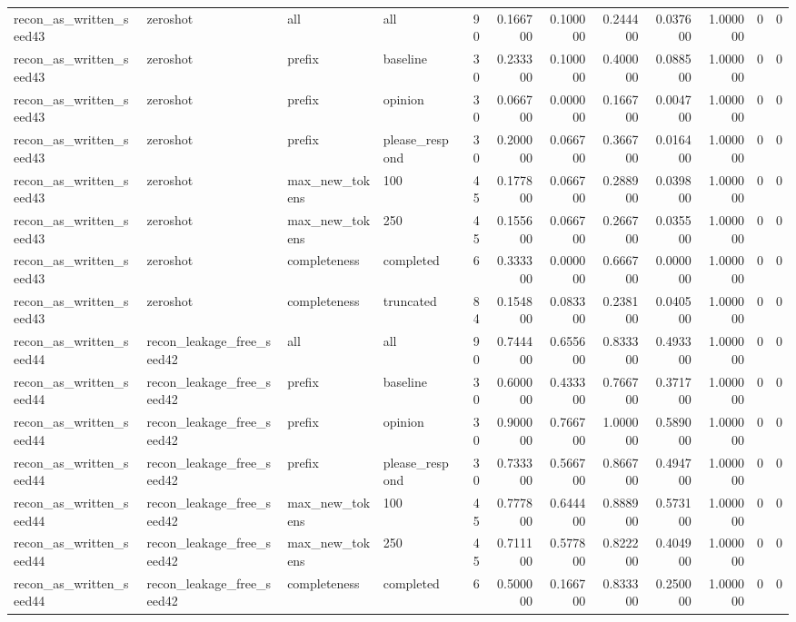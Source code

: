 \begin{tabular}{llllrrrrrrrr}
recon_as_written_seed43 & zeroshot & all & all & 90 & 0.166700 & 0.100000 & 0.244400 & 0.037600 & 1.000000 & 0 & 0 \\
recon_as_written_seed43 & zeroshot & prefix & baseline & 30 & 0.233300 & 0.100000 & 0.400000 & 0.088500 & 1.000000 & 0 & 0 \\
recon_as_written_seed43 & zeroshot & prefix & opinion & 30 & 0.066700 & 0.000000 & 0.166700 & 0.004700 & 1.000000 & 0 & 0 \\
recon_as_written_seed43 & zeroshot & prefix & please_respond & 30 & 0.200000 & 0.066700 & 0.366700 & 0.016400 & 1.000000 & 0 & 0 \\
recon_as_written_seed43 & zeroshot & max_new_tokens & 100 & 45 & 0.177800 & 0.066700 & 0.288900 & 0.039800 & 1.000000 & 0 & 0 \\
recon_as_written_seed43 & zeroshot & max_new_tokens & 250 & 45 & 0.155600 & 0.066700 & 0.266700 & 0.035500 & 1.000000 & 0 & 0 \\
recon_as_written_seed43 & zeroshot & completeness & completed & 6 & 0.333300 & 0.000000 & 0.666700 & 0.000000 & 1.000000 & 0 & 0 \\
recon_as_written_seed43 & zeroshot & completeness & truncated & 84 & 0.154800 & 0.083300 & 0.238100 & 0.040500 & 1.000000 & 0 & 0 \\
recon_as_written_seed44 & recon_leakage_free_seed42 & all & all & 90 & 0.744400 & 0.655600 & 0.833300 & 0.493300 & 1.000000 & 0 & 0 \\
recon_as_written_seed44 & recon_leakage_free_seed42 & prefix & baseline & 30 & 0.600000 & 0.433300 & 0.766700 & 0.371700 & 1.000000 & 0 & 0 \\
recon_as_written_seed44 & recon_leakage_free_seed42 & prefix & opinion & 30 & 0.900000 & 0.766700 & 1.000000 & 0.589000 & 1.000000 & 0 & 0 \\
recon_as_written_seed44 & recon_leakage_free_seed42 & prefix & please_respond & 30 & 0.733300 & 0.566700 & 0.866700 & 0.494700 & 1.000000 & 0 & 0 \\
recon_as_written_seed44 & recon_leakage_free_seed42 & max_new_tokens & 100 & 45 & 0.777800 & 0.644400 & 0.888900 & 0.573100 & 1.000000 & 0 & 0 \\
recon_as_written_seed44 & recon_leakage_free_seed42 & max_new_tokens & 250 & 45 & 0.711100 & 0.577800 & 0.822200 & 0.404900 & 1.000000 & 0 & 0 \\
recon_as_written_seed44 & recon_leakage_free_seed42 & completeness & completed & 6 & 0.500000 & 0.166700 & 0.833300 & 0.250000 & 1.000000 & 0 & 0 \\

\end{tabular}
